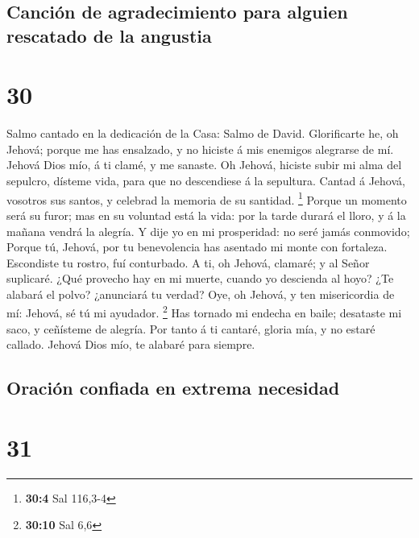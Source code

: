 \hypertarget{canciuxf3n-de-agradecimiento-para-alguien-rescatado-de-la-angustia}{%
\subsection{Canción de agradecimiento para alguien rescatado de la
angustia}\label{canciuxf3n-de-agradecimiento-para-alguien-rescatado-de-la-angustia}}

\hypertarget{section-29}{%
\section{30}\label{section-29}}

 Salmo cantado en la dedicación de la Casa: Salmo de David.
Glorificarte he, oh Jehová; porque me has ensalzado, y no hiciste á mis
enemigos alegrarse de mí.  Jehová Dios mío, á ti clamé, y me
sanaste.  Oh Jehová, hiciste subir mi alma del sepulcro,
dísteme vida, para que no descendiese á la sepultura. 
Cantad á Jehová, vosotros sus santos, y celebrad la memoria de su
santidad. \footnote{\textbf{30:4} Sal 116,3-4}  Porque un
momento será su furor; mas en su voluntad está la vida: por la tarde
durará el lloro, y á la mañana vendrá la alegría.  Y dije yo
en mi prosperidad: no seré jamás conmovido;  Porque tú,
Jehová, por tu benevolencia has asentado mi monte con fortaleza.
Escondiste tu rostro, fuí conturbado.  A ti, oh Jehová,
clamaré; y al Señor suplicaré.  ¿Qué provecho hay en mi
muerte, cuando yo descienda al hoyo? ¿Te alabará el polvo? ¿anunciará tu
verdad?  Oye, oh Jehová, y ten misericordia de mí: Jehová,
sé tú mi ayudador. \footnote{\textbf{30:10} Sal 6,6}  Has
tornado mi endecha en baile; desataste mi saco, y ceñísteme de alegría.
 Por tanto á ti cantaré, gloria mía, y no estaré callado.
Jehová Dios mío, te alabaré para siempre.

\hypertarget{oraciuxf3n-confiada-en-extrema-necesidad}{%
\subsection{Oración confiada en extrema
necesidad}\label{oraciuxf3n-confiada-en-extrema-necesidad}}

\hypertarget{section-30}{%
\section{31}\label{section-30}}

